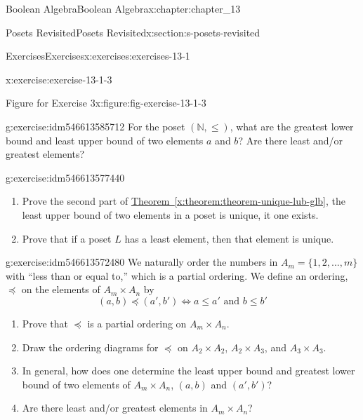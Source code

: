 \documentclass[oneside,10pt,]{book}
\newcommand{\xreffont}{\relax}
\numberwithin{equation}{section}
\begin{document}
\begin{chapterptx}{Boolean Algebra}{}{Boolean Algebra}{}{}{x:chapter:chapter_13}
\begin{sectionptx}{Posets Revisited}{}{Posets Revisited}{}{}{x:section:s-posets-revisited}
\begin{exercises-subsection}{Exercises}{}{Exercises}{}{}{x:exercises:exercises-13-1}
\begin{divisionexercise}{3}{}{}{x:exercise:exercise-13-1-3}
\begin{figureptx}{Figure for Exercise 3}{x:figure:fig-exercise-13-1-3}{}
\begin{image}{0.1}{0.8}{0.1}
\end{image}%
\tcblower
\end{figureptx}%
\end{divisionexercise}%
\begin{divisionexercise}{4}{}{}{g:exercise:idm546613585712}%
For the poset \((\mathbb{N},\leq )\), what are the greatest lower bound and least upper bound of two elements \(a\) and \(b\)? Are there least and\slash{}or greatest elements?%
\end{divisionexercise}%
\begin{divisionexercise}{5}{}{}{g:exercise:idm546613577440}%
%
\begin{enumerate}[label=(\alph*)]
\item{}Prove the second part of \hyperref[x:theorem:theorem-unique-lub-glb]{Theorem~{\xreffont\ref{x:theorem:theorem-unique-lub-glb}}}, the least upper bound of two elements in a poset is unique, it one exists.%
\item{}Prove that if a poset \(L\) has a least element, then that element is unique.%
\end{enumerate}
%
\end{divisionexercise}%
\begin{divisionexercise}{6}{}{}{g:exercise:idm546613572480}%
We naturally order the numbers in \(A_m = \{1, 2, . . . , m\}\) with ``less than or equal to,'' which is a partial ordering. We define an ordering, \(\preceq\)  on the elements of \(A_m \times  A_n\) by%
\begin{equation*}
(a, b) \preceq  (a', b') \Leftrightarrow a \leq  a' \textrm{ and } b \leq  b'
\end{equation*}
%
\begin{enumerate}[label=(\alph*)]
\item{}Prove that \(\preceq\) is a partial ordering on \(A_m \times  A_n\).%
\item{}Draw the ordering diagrams for \(\preceq\) on \(A_2 \times  A_2\), \(A_2\times  A_3\), and \(A_3 \times  A_3\).%
\item{}In general, how does one determine the least upper bound  and greatest lower bound of two elements of \(A_m \times  A_n\), \((a, b)\) and \((a',b')\)?%
\item{}Are there least and\slash{}or greatest elements in \(A_m \times  A_n\)?%
\end{enumerate}
%
\end{divisionexercise}%
\end{exercises-subsection}
\end{sectionptx}

\end{chapterptx}
\end{document}
